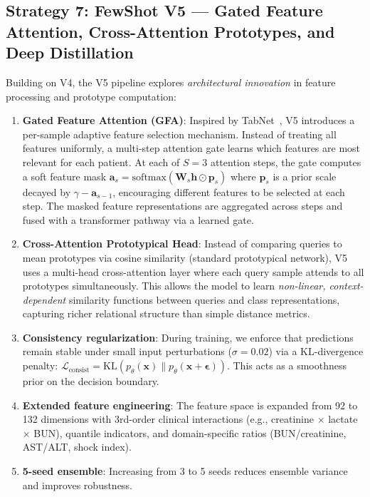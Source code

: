 \subsection{Strategy 7: FewShot V5 --- Gated Feature Attention, Cross-Attention Prototypes, and Deep Distillation}
\label{sec:v5-strategy}

Building on V4, the V5 pipeline explores \emph{architectural innovation} in feature processing and prototype computation:

\begin{enumerate}
\item \textbf{Gated Feature Attention (GFA)}: Inspired by TabNet~\cite{arik2021tabnet}, V5 introduces a per-sample adaptive feature selection mechanism. Instead of treating all features uniformly, a multi-step attention gate learns which features are most relevant for each patient. At each of $S=3$ attention steps, the gate computes a soft feature mask $\mathbf{a}_s = \text{softmax}(\mathbf{W}_s \mathbf{h} \odot \mathbf{p}_s)$ where $\mathbf{p}_s$ is a prior scale decayed by $\gamma - \mathbf{a}_{s-1}$, encouraging different features to be selected at each step. The masked feature representations are aggregated across steps and fused with a transformer pathway via a learned gate.

\item \textbf{Cross-Attention Prototypical Head}: Instead of comparing queries to mean prototypes via cosine similarity (standard prototypical network), V5 uses a multi-head cross-attention layer where each query sample attends to all prototypes simultaneously. This allows the model to learn \emph{non-linear, context-dependent} similarity functions between queries and class representations, capturing richer relational structure than simple distance metrics.

\item \textbf{Consistency regularization}: During training, we enforce that predictions remain stable under small input perturbations ($\sigma = 0.02$) via a KL-divergence penalty: $\mathcal{L}_{\text{consist}} = \text{KL}(p_\theta(\mathbf{x}) \| p_\theta(\mathbf{x} + \boldsymbol{\epsilon}))$. This acts as a smoothness prior on the decision boundary.

\item \textbf{Extended feature engineering}: The feature space is expanded from 92 to 132 dimensions with 3rd-order clinical interactions (e.g., creatinine $\times$ lactate $\times$ BUN), quantile indicators, and domain-specific ratios (BUN/creatinine, AST/ALT, shock index).

\item \textbf{5-seed ensemble}: Increasing from 3 to 5 seeds reduces ensemble variance and improves robustness.
\end{enumerate}

